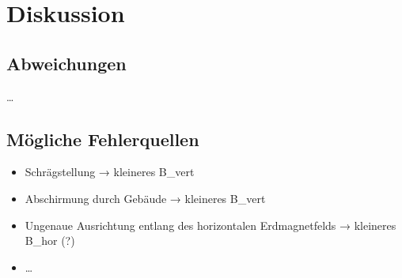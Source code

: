 \section{Diskussion}
\label{sec:diskussion}

\subsection{Abweichungen}

…


\subsection{Mögliche Fehlerquellen}

\begin{itemize}
    \item Schrägstellung → kleineres B_vert
    \item Abschirmung durch Gebäude → kleineres B_vert
    \item Ungenaue Ausrichtung entlang des horizontalen Erdmagnetfelds → kleineres B_hor (?)
    \item …
\end{itemize}
